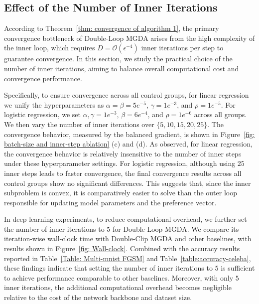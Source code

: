 \documentclass[twoside]{article} %
\theoremstyle{plain}
\theoremstyle{definition}
\theoremstyle{remark}
\begin{document}
\subsection{Effect of the Number of Inner Iterations}\label{Appendix: inner-iteration and wall-clock}
According to Theorem~\ref{thm: convergence of algorithm 1}, the primary convergence bottleneck of Double-Loop MGDA arises from the high complexity of the inner loop, which requires $D=\mathcal{O}(\epsilon^{-4})$ inner iterations per step to guarantee convergence. In this section, we study the practical choice of the number of inner iterations, aiming to balance overall computational cost and convergence performance.

Specifically, to ensure convergence across all control groups, for linear regression we unify the hyperparameters as $\alpha=\beta = 5e^{-5}$, $\gamma = 1e^{-3}$, and $\rho = 1e^{-5}$. For logistic regression, we set $\alpha, \gamma = 1e^{-3}$, $\beta = 6e^{-4}$, and $\rho = 1e^{-6}$ across all groups. We then vary the number of inner iterations over $\{5, 10, 15, 20, 25\}$. The convergence behavior, measured by the balanced gradient, is shown in Figure~\ref{fig: batch-size and inner-step ablation} (c) and (d). As observed, for linear regression, the convergence behavior is relatively insensitive to the number of inner steps under these hyperparameter settings. For logistic regression, although using $25$ inner steps leads to faster convergence, the final convergence results across all control groups show no significant differences. This suggests that, since the inner subproblem is convex, it is comparatively easier to solve than the outer loop responsible for updating model parameters and the preference vector.

In deep learning experiments, to reduce computational overhead, we further set the number of inner iterations to $5$ for Double-Loop MGDA. We compare its iteration-wise wall-clock time with Double-Clip MGDA and other baselines, with results shown in Figure~\ref{fig: Wall-clock}. Combined with the accuracy results reported in Table~\ref{Table: Multi-mnist FGSM} and Table~\ref{table:accuracy-celeba}, these findings indicate that setting the number of inner iterations to $5$ is sufficient to achieve performance comparable to other baselines. Moreover, with only $5$ inner iterations, the additional computational overhead becomes negligible relative to the cost of the network backbone and dataset size.
\end{document}
